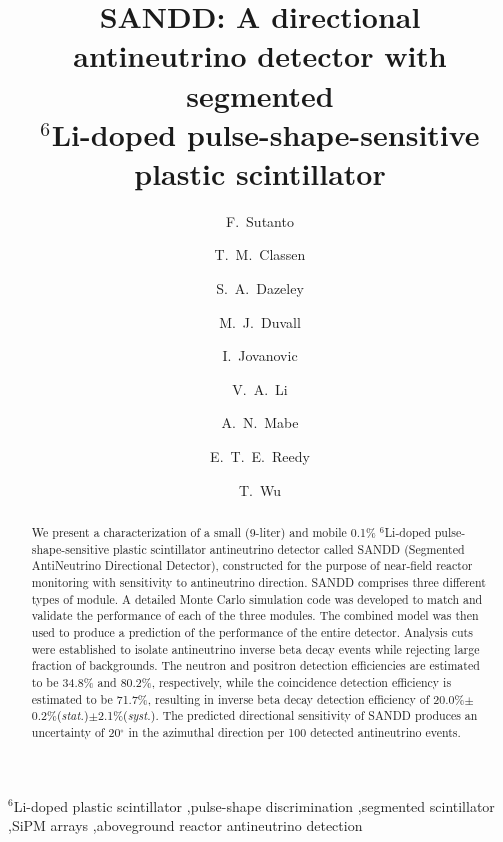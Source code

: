 \documentclass[final,5p,times,twocolumn]{elsarticle}
\begin{document}
\begin{frontmatter}

\title{SANDD: A directional antineutrino detector with segmented  \\ $^6$Li-doped pulse-shape-sensitive plastic scintillator }

\author[UM,LLNL]{F.~Sutanto}
\author[LLNL]   {T.~M.~Classen}
\author[LLNL]   {S.~A.~Dazeley}
\author[UH]     {M.~J.~Duvall} 
\author[UM]     {I.~Jovanovic} 
\author[LLNL]   {V.~A.~Li}
\author[LLNL]   {A.~N.~Mabe\footnotemark[1]}
\author[LLNL]   {E.~T.~E.~Reedy}
\author[UM]     {T.~Wu}

\address[UM]{Department of Nuclear Engineering and Radiological Sciences, University of Michigan, Ann Arbor, MI 48109}
\address[LLNL]{Lawrence Livermore National Laboratory, Livermore, CA 94550}
\address[UH]{Department of Physics and Astronomy, University of Hawai`i at M\={a}noa, Honolulu, HI 96822}

\begin{abstract}
\noindent We present a characterization of a small (9-liter) and mobile 0.1\% $^6$Li-doped pulse-shape-sensitive plastic scintillator antineutrino detector called SANDD (Segmented AntiNeutrino Directional Detector), constructed for the purpose of near-field reactor monitoring with sensitivity to antineutrino direction. 
SANDD comprises three different types of module. 
A detailed Monte Carlo simulation code was developed to match and validate the performance of each of the three modules. The combined model was then used to produce a prediction of the performance of the entire detector. 
Analysis cuts were established to isolate antineutrino inverse beta decay events while rejecting large fraction of backgrounds.
The neutron and positron detection efficiencies are estimated to be 34.8\% and 80.2\%, respectively, while the coincidence detection efficiency is estimated to be 71.7\%, resulting in inverse beta decay detection efficiency of 20.0\%$\pm$0.2\%(\textit{stat.})$\pm$2.1\%(\textit{syst.}). 
The predicted directional sensitivity of SANDD produces an uncertainty of 20$^\circ$ in the azimuthal direction per 100 detected antineutrino events.
\end{abstract}

\begin{keyword}
$^6$Li-doped plastic scintillator \sep pulse-shape discrimination \sep segmented scintillator \sep SiPM arrays \sep  aboveground reactor antineutrino detection 
\end{keyword}

\end{frontmatter}
\end{document}
